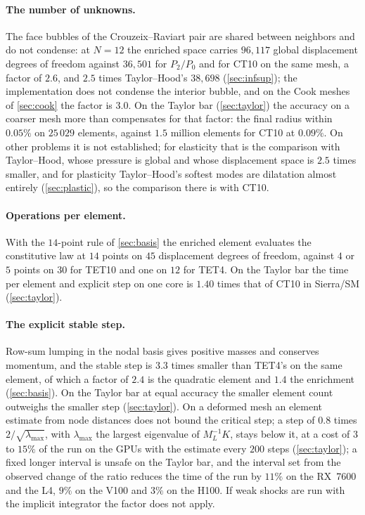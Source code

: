 \documentclass{article}
\theoremstyle{definition}
\theoremstyle{plain}
\begin{document}
\paragraph{The number of unknowns.} The face bubbles of the Crouzeix--Raviart
pair are shared between neighbors and do not condense: at $N = 12$ the
enriched space carries $96{,}117$ global displacement degrees of freedom
against $36{,}501$ for $P_2/P_0$ and for CT10 on the
same mesh, a factor of $2.6$, and $2.5$ times Taylor--Hood's $38{,}698$
(\cref{sec:infsup}); the implementation does not condense the interior
bubble, and on the Cook meshes of \cref{sec:cook} the factor is $3.0$.
On the Taylor bar (\cref{sec:taylor}) the accuracy on a coarser mesh
more than compensates for that factor: the final radius within $0.05\%$ on
$25\,029$ elements, against $1.5$ million elements for CT10 at $0.09\%$. On other problems it is not established; for
elasticity that is the
comparison with Taylor--Hood, whose pressure is global and whose displacement
space is $2.5$ times smaller, and for plasticity Taylor--Hood's softest modes
are dilatation almost entirely (\cref{sec:plastic}), so the comparison there
is with CT10.

\paragraph{Operations per element.} With the $14$-point rule of
\cref{sec:basis} the enriched element evaluates the constitutive law at $14$
points on $45$ displacement degrees of freedom, against $4$ or $5$ points on
$30$ for TET10 and one on $12$ for TET4. On the Taylor bar the time per
element and explicit step on one core is $1.40$ times that of CT10 in Sierra/SM (\cref{sec:taylor}).

\paragraph{The explicit stable step.} Row-sum lumping in the nodal basis gives
positive masses and conserves momentum, and the stable step is $3.3$ times
smaller than TET4's on the same element, of which a factor of $2.4$
is the quadratic element and $1.4$ the enrichment (\cref{sec:basis}). On the Taylor bar at equal accuracy the smaller
element count outweighs the smaller step (\cref{sec:taylor}). On a
deformed mesh an element estimate from node distances does not bound the
critical step; a step of $0.8$ times $2/\sqrt{\lambda_{\max}}$, with
$\lambda_{\max}$ the largest eigenvalue of $M_L^{-1}K$, stays below it, at
a cost of $3$ to $15\%$ of the run on the GPUs with the estimate every
$200$ steps (\cref{sec:taylor}); a fixed longer interval is unsafe on the
Taylor bar, and the interval set from the observed change of the ratio
reduces the time of the run by $11\%$ on the RX~7600 and the L4, $9\%$ on
the V100 and $3\%$ on the H100. If weak shocks are run with the
implicit integrator the factor does not apply.
\end{document}
